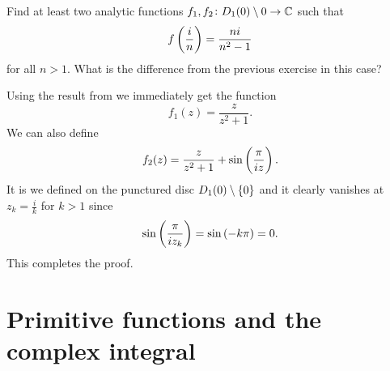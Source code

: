 \documentclass[11pt,a4paper]{article}
\begin{document}
\begin{exercise}
  Find at least two analytic functions
  $f_1,f_2 \colon D_1(0) \setminus {0} \to \mathbb{C}$ such that
  \[
    f\del{\frac{i}{n}} = \frac{n i}{n^2 - 1}
  \]
  for all $n > 1$.
  What is the difference from the previous exercise in this case?
\end{exercise}
\begin{solution}
  Using the result from 
  we immediately get the function
  \[
    f_1(z) = \frac{z}{z^2 + 1}.
  \]
  We can also define
  \[
    f_2(z) = \frac{z}{z^2 + 1} + \sin\del{\frac{\pi}{i z}}.
  \]
  It is we defined on the punctured disc $D_1(0) \setminus \left\{0\right\}$ and
  it clearly vanishes at $z_k = \frac{i}{k}$ for $k > 1$ since
  \[
    \sin\del{\frac{\pi}{i z_k}} =
    \sin\del{- k \pi} = 0.
  \]
  This completes the proof.
\end{solution}

\newpage

\section{Primitive functions and the complex integral}
\end{document}

